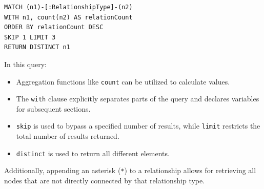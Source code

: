 \begin{lstlisting}[style=Cypher]
MATCH (n1)-[:RelationshipType]-(n2)
WITH n1, count(n2) AS relationCount
ORDER BY relationCount DESC
SKIP 1 LIMIT 3
RETURN DISTINCT n1
\end{lstlisting}
In this query:
\begin{itemize}
    \item Aggregation functions like \texttt{count} can be utilized to calculate values.
    \item The \texttt{with} clause explicitly separates parts of the query and declares variables for subsequent sections.
    \item \texttt{skip} is used to bypass a specified number of results, while \texttt{limit} restricts the total number of results returned.
    \item \texttt{distinct} is used to return all different elements.
\end{itemize}
Additionally, appending an asterisk (\texttt{*}) to a relationship allows for retrieving all nodes that are not directly connected by that relationship type.

